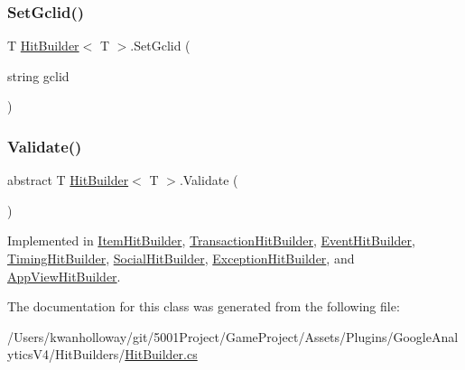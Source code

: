 \mbox{\label{class_hit_builder_a2955d4278dea7ae27067f1b7ec053e77}} 
\subsubsection{\texorpdfstring{Set\+Gclid()}{SetGclid()}}
{\footnotesize\ttfamily T \hyperlink{class_hit_builder}{Hit\+Builder}$<$ T $>$.Set\+Gclid (\begin{DoxyParamCaption}\item[{string}]{gclid }\end{DoxyParamCaption})}

\mbox{\label{class_hit_builder_a0f4833828bd530bb057c9ca359584bce}} 
\subsubsection{\texorpdfstring{Validate()}{Validate()}}
{\footnotesize\ttfamily abstract T \hyperlink{class_hit_builder}{Hit\+Builder}$<$ T $>$.Validate (\begin{DoxyParamCaption}{ }\end{DoxyParamCaption})\hspace{0.3cm}{\ttfamily [pure virtual]}}



Implemented in \hyperlink{class_item_hit_builder_acaaf2b68e53e2c9275f2e9020f97ddcf}{Item\+Hit\+Builder}, \hyperlink{class_transaction_hit_builder_a6bde66350f8ccd032418d150f9bae1f9}{Transaction\+Hit\+Builder}, \hyperlink{class_event_hit_builder_ac25f1311eb1e5ab9910494fd143a6f8f}{Event\+Hit\+Builder}, \hyperlink{class_timing_hit_builder_ad8ac9c4003cc9d865198f01acb7f81bd}{Timing\+Hit\+Builder}, \hyperlink{class_social_hit_builder_a55388edd43f10cc41918833aa2526a8e}{Social\+Hit\+Builder}, \hyperlink{class_exception_hit_builder_a92267f29b56b25eecdb6830f3489bace}{Exception\+Hit\+Builder}, and \hyperlink{class_app_view_hit_builder_a2336a0b7cb1a3179b86eb54ce6d0344f}{App\+View\+Hit\+Builder}.



The documentation for this class was generated from the following file\+:\begin{DoxyCompactItemize}
\item 
/\+Users/kwanholloway/git/5001\+Project/\+Game\+Project/\+Assets/\+Plugins/\+Google\+Analytics\+V4/\+Hit\+Builders/\hyperlink{_hit_builder_8cs}{Hit\+Builder.\+cs}\end{DoxyCompactItemize}
